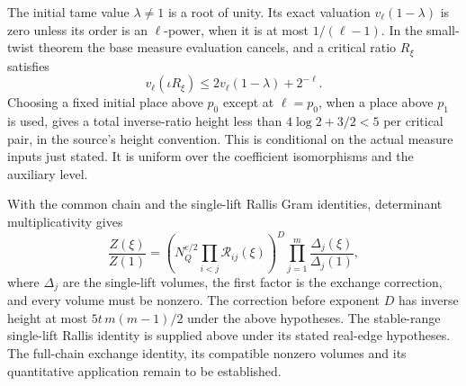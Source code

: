 The initial tame value \(\lambda\ne1\) is a root of unity.
Its exact valuation \(v_\ell(1-\lambda)\) is zero unless its
order is an \(\ell\)-power, when it is at most
\(1/(\ell-1)\). In the small-twist theorem the base measure
evaluation cancels, and a critical ratio \(R_\xi\) satisfies
\[
 v_\ell(\iota R_\xi)\le2v_\ell(1-\lambda)+2^{-\ell}.
\]
Choosing a fixed initial place above \(p_0\) except at
\(\ell=p_0\), when a place above \(p_1\) is used, gives
a total inverse-ratio height less than
\(4\log 2+3/2<5\) per critical pair, in the source's
height convention. This is conditional on the actual
measure inputs just stated. It is uniform over the
coefficient isomorphisms and the auxiliary level.

With the common chain and the single-lift Rallis Gram
identities, determinant multiplicativity gives
\[
 \frac{Z(\xi)}{Z(1)}
 =\left(N_Q^{e/2}\prod_{i<j}\mathcal R_{ij}(\xi)\right)^D
       \prod_{j=1}^m\frac{\Delta_j(\xi)}{\Delta_j(1)},
\]
where \(\Delta_j\) are the single-lift volumes, the first
factor is the exchange correction, and every volume must be
nonzero. The correction before exponent \(D\) has inverse
height at most \(5t\,m(m-1)/2\) under the above hypotheses.
The stable-range single-lift Rallis identity is supplied above under
its stated real-edge hypotheses. The full-chain exchange identity,
its compatible nonzero volumes and its quantitative application
remain to be established.


